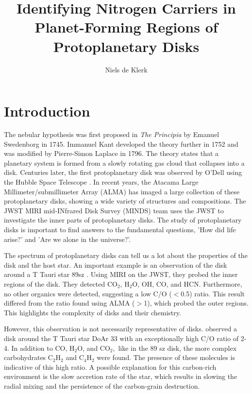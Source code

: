 \documentclass[twoside, single, authoryear, semicolon]{lion-msc}
\title{Identifying Nitrogen Carriers in Planet-Forming Regions of Protoplanetary Disks}
\author{Niels de Klerk}
\affiliation{Leiden Observatory, Universiteit Leiden}
\date{\displaydate{date}}
\newcommand{\4}{$_4$}
\newcommand{\3}{$_3$}
\newcommand{\2}{$_2$}
\begin{document}

\maketitle

\tableofcontents
\cleardoublepage
{}
\chapter{Introduction}
The nebular hypothesis was first proposed in \textit{The Principia} by Emanuel Swedenborg in 1745. Immanuel Kant developed the theory further in 1752 and was modified by Pierre-Simon Laplace in 1796. The theory states that a planetary system is formed from a slowly rotating gas cloud that collapses into a disk. Centuries later, the first protoplanetary disk was observed by O'Dell using the Hubble Space Telescope \citep{ODell1993}. In recent years, the Atacama Large Millimeter/submillimeter Array (ALMA) has imaged a large collection of these protoplanetary disks, showing a wide variety of structures and compositions. The JWST MIRI mid-INfrared Disk Survey (MINDS) team uses the JWST to investigate the inner parts of protoplanetary disks. The study of protoplanetary disks is important to find answers to the fundamental questions, 'How did life arise?' and 'Are we alone in the universe?'.

The spectrum of protoplanetary disks can tell us a lot about the properties of the disk and the host star. An important example is an observation of the disk around a T Tauri star 89sz \citep{Gasman_2023}. Using MIRI on the JWST, they probed the inner regions of the disk. They detected CO$_2$, H$_2$O, OH, CO, and HCN. Furthermore, no other organics were detected, suggesting a low C/O ($<$0.5) ratio. This result differed from the ratio found using ALMA ($>$1), which probed the outer regions. This highlights the complexity of disks and their chemistry.

However, this observation is not necessarily representative of disks. \cite{colmenares2024jwstmiridetectioncarbonrichchemistry} observed a disk around the T Tauri star DoAr 33 with an exceptionally high C/O ratio of 2-4. In addition to CO, H$_2$O, and CO$_2,$ like in the 89 sz disk, the more complex carbohydrates C$_2$H$_2$ and C$_4$H$_2$ were found. The presence of these molecules is indicative of this high ratio. A possible explanation for this carbon-rich environment is the slow accretion rate of the star, which results in slowing the radial mixing and the persistence of the carbon-grain destruction.
\end{document}
